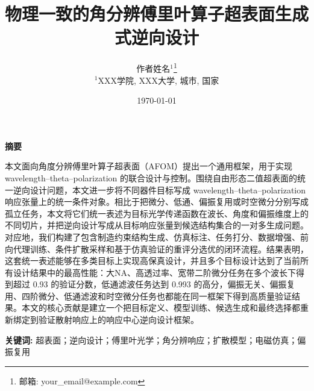 \documentclass[10pt,a4paper]{article}
\renewenvironment{abstract}{%
  \begin{center}%
    \bfseries 摘要
  \end{center}%
  \par
  \setlength{\parindent}{2em}%
}{\par}
\begin{document}
\title{物理一致的角分辨傅里叶算子超表面生成式逆向设计}

\author{%
作者姓名$^{1}$\thanks{邮箱: your\_email@example.com} \\
\small $^{1}$XXX学院, XXX大学, 城市, 国家%
}

\date{\today}

\maketitle

\begin{abstract}
本文面向角度分辨傅里叶算子超表面（AFOM）提出一个通用框架，用于实现 wavelength--theta--polarization 的联合设计与控制。围绕自由形态二值超表面的统一逆向设计问题，本文进一步将不同器件目标写成 wavelength--theta--polarization 响应张量上的统一条件对象。相比于把微分、低通、偏振复用或时空微分分别写成孤立任务，本文将它们统一表述为目标光学传递函数在波长、角度和偏振维度上的不同切片，并把逆向设计写成从目标响应张量到候选结构集合的一对多生成问题。对应地，我们构建了包含制造约束结构生成、仿真标注、任务打分、数据增强、前向代理训练、条件扩散采样和基于仿真验证的重评分选优的闭环流程。结果表明，这套统一表述能够在多类目标上实现高保真设计，并且多个目标设计达到了当前所有设计结果中的最高性能：大NA、高透过率、宽带二阶微分任务在多个波长下得到超过 0.93 的验证分数，低通滤波任务达到 0.993 的高分，偏振无关、偏振复用、四阶微分、低通滤波和时空微分任务也都能在同一框架下得到高质量验证结果。本文的核心贡献是建立一个把目标定义、模型训练、候选生成和最终选择都重新绑定到验证散射响应上的响应中心逆向设计框架。

\vspace{0.5em}
\noindent\textbf{关键词:} 超表面；逆向设计；傅里叶光学；角分辨响应；扩散模型；电磁仿真；偏振复用
\end{abstract}









\end{document}

